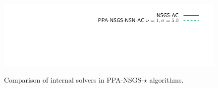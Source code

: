\begin{figure}
\\
{\includegraphics[height=\legendheight]{../figure/PROX/NSGS/InternalSolvers/1.0e-08/50/time/profile-Chain_legend.pdf}}
 \caption{Comparison of internal solvers in {\sf PPA-NSGS-$\star$} algorithms.}
  \label{fig:PROX/NSGS/InternalSolvers}
\end{figure}

